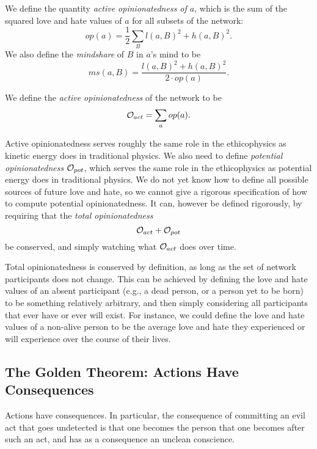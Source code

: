 \documentclass{article}
\begin{document}
We define the quantity {\em active opinionatedness of $a$}, which is
the sum of the squared love and hate values of $a$ for all subsets of
the network:
$$op(a) = \frac{1}{2} \sum_B l(a, B)^2 + h(a, B)^2.$$ We also define the {\em mindshare} of $B$ in $a$'s mind to be
$$ms(a, B) = \frac{l(a, B)^2 + h(a, B)^2}{2 \cdot op(a)}.$$

We define the {\em active opinionatedness} of the network to be
$${\mathcal O}_{act} = \sum_a op(a).$$ 

Active opinionatedness serves roughly the same role in the
ethicophysics as kinetic energy does in traditional physics. We also
need to define {\em potential opinionatedness} ${\mathcal O}_{pot}$, which
serves the same role in the ethicophysics as potential energy does in
traditional physics. We do not yet know how to define all possible
sources of future love and hate, so we cannot give a rigorous
specification of how to compute potential opinionatedness. It can,
however be defined rigorously, by requiring that the {\em total
  opinionatedness}
$${\mathcal O}_{act} + {\mathcal O}_{pot}$$ be conserved, and simply watching what
${\mathcal O}_{act}$ does over time.

Total opinionatedness is conserved by definition, as long as the set
of network participants does not change. This can be achieved by
defining the love and hate values of an absent participant (e.g., a
dead person, or a person yet to be born) to be something relatively
arbitrary, and then simply considering all participants that ever have
or ever will exist. For instance, we could define the love and hate
values of a non-alive person to be the average love and hate they
experienced or will experience over the course of their lives.

\subsection{The Golden Theorem: Actions Have Consequences} 

\begin{thm}
  Actions have consequences. In particular, the consequence of
  committing an evil act that goes undetected is that one becomes the
  person that one becomes after such an act, and has as a consequence
  an unclean conscience.
\end{thm}
\end{document}

